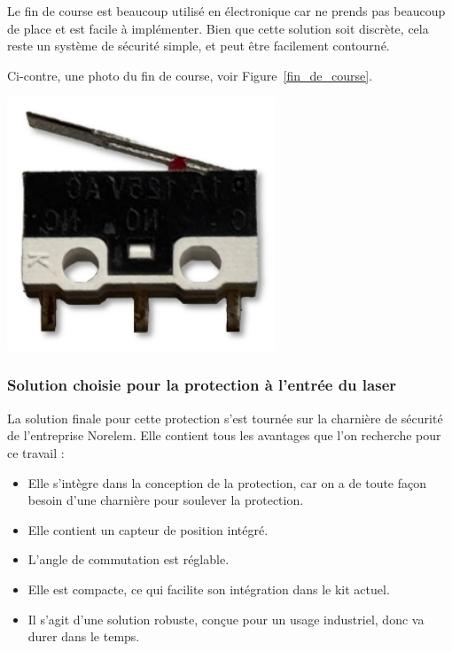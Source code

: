 \begin{minipage}[c]{0.6\textwidth}
    Le fin de course est beaucoup utilisé en électronique car ne prends pas beaucoup de place et est facile à implémenter. Bien que cette solution soit discrète, cela reste un système de sécurité simple, et peut être facilement contourné.

    Ci-contre, une photo du fin de course, voir Figure~\ref{fin_de_course}.
\end{minipage}\hfill
\begin{minipage}[c]{0.35\textwidth}
    \begin{center}
        \includegraphics[width=0.6\textwidth]{assets/figures/Protections_laser/fin_de_course.png}
    \end{center}
    \label{fin_de_course}
\end{minipage}

\newpage
\subsubsection{Solution choisie pour la protection à l'entrée du laser}
La solution finale pour cette protection s'est tournée sur la charnière de sécurité de l'entreprise Norelem. Elle contient tous les avantages que l'on recherche pour ce travail :
\begin{itemize}
    \item Elle s'intègre dans la conception de la protection, car on a de toute façon besoin d'une charnière pour soulever la protection.
    \item Elle contient un capteur de position intégré.
    \item L'angle de commutation est réglable.
    \item Elle est compacte, ce qui facilite son intégration dans le kit actuel.
    \item Il s'agit d'une solution robuste, conçue pour un usage industriel, donc va durer dans le temps.
\end{itemize}

